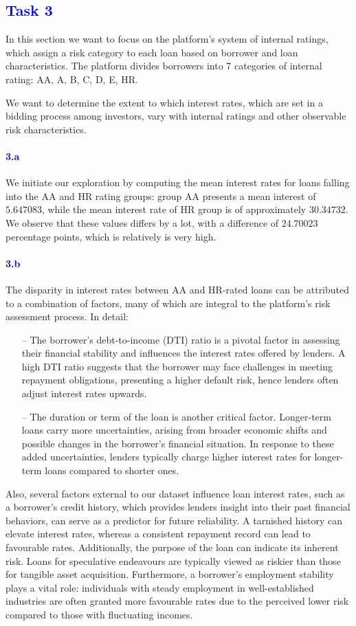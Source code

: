 \documentclass[a4paper,12pt]{article}
\begin{document}
\pagebreak
\textcolor{Blue}{\section{Task 3}}
In this section we want to focus on the platform's system of internal ratings, which assign a risk category to each loan based on borrower and loan characteristics. The platform divides borrowers into 7 categories of internal rating: AA, A, B, C, D, E, HR.

We want to determine the extent to which interest rates, which are set in a bidding process among investors, vary with internal ratings and other observable risk characteristics.
\paragraph{\textcolor{Blue}{3.a}} We initiate our exploration by computing the mean interest rates for loans falling into the AA and HR rating groups: group AA presents a mean interest of $5.647083$, while the mean interest rate of HR group is of approximately $30.34732$. We observe that these values differs by a lot, with a difference of $24.70023$ percentage points, which is relatively is very high. 

\paragraph{\textcolor{Blue}{3.b}} The disparity in interest rates between AA and HR-rated loans can be attributed to a combination of factors, many of which are integral to the platform's risk assessment process. In detail:
\begin{itemize}
    \item [--] The borrower's debt-to-income (DTI) ratio is a pivotal factor in assessing their financial stability and influences the interest rates offered by lenders. A high DTI ratio suggests that the borrower may face challenges in meeting repayment obligations, presenting a higher default risk, hence lenders often adjust interest rates upwards.
    \item [--] The duration or term of the loan is another critical factor. Longer-term loans carry more uncertainties, arising from broader economic shifts and possible changes in the borrower's financial situation. In response to these added uncertainties, lenders typically charge higher interest rates for longer-term loans compared to shorter ones.
\end{itemize}
Also, several factors external to our dataset influence loan interest rates, such as a borrower's credit history, which provides lenders insight into their past financial behaviors, can serve as a predictor for future reliability. A tarnished history can elevate interest rates, whereas a consistent repayment record can lead to favourable rates. Additionally, the purpose of the loan can indicate its inherent risk. Loans for speculative endeavours are typically viewed as riskier than those for tangible asset acquisition. Furthermore, a borrower's employment stability plays a vital role: individuals with steady employment in well-established industries are often granted more favourable rates due to the perceived lower risk compared to those with fluctuating incomes.
\end{document}
